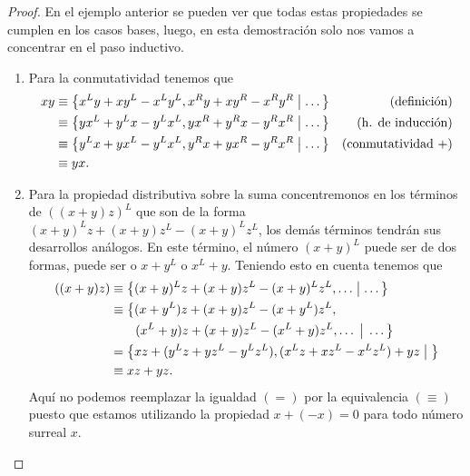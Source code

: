     \begin{proof}
        En el ejemplo anterior se pueden ver que todas estas propiedades se cumplen en los casos bases, luego, en esta demostraci\'on solo nos vamos a concentrar en el paso inductivo.

        \begin{enumerate}
            \item Para la conmutatividad tenemos que 
            \begin{align*}
                xy & \equiv \left\{x^Ly+xy^L-x^Ly^L, x^Ry+xy^R-x^Ry^R\;\middle|\; \dots\right\} &\text{(definici\'on)} \\
                & \equiv \left\{yx^L+y^Lx-y^Lx^L, yx^R+y^Rx-y^Rx^R\;\middle|\; \dots\right\} &\text{(h. de inducci\'on)} \\
                & \equiv \left\{y^Lx+yx^L-y^Lx^L, y^Rx+yx^R-y^Rx^R\;\middle|\; \dots\right\} &\text{(conmutatividad +)} \\
                & \equiv yx.
            \end{align*}
            \item Para la propiedad distributiva sobre la suma concentremonos en los t\'erminos de $((x+y)z)^L$ que son de la forma $(x+y)^Lz + (x+y)z^L - (x+y)^Lz^L$, los dem\'as t\'erminos tendr\'an sus desarrollos an\'alogos. En este t\'ermino, el n\'umero $(x+y)^L$ puede ser de dos formas, puede ser o $x+y^L$ o $x^L+y$. Teniendo esto en cuenta tenemos que 
            \begin{align*}
                ((x+y)z) & \equiv \left\{(x+y)^Lz + (x+y)z^L - (x+y)^Lz^L, \dots\;\middle|\; \dots\right\}\\
                & \equiv \big\{(x+y^L)z + (x+y)z^L - (x+y^L)z^L, \\
                & \quad\quad (x^L+y)z + (x+y)z^L - (x^L+y)z^L, \dots\;\big|\;\dots\big\} \\
                & = \left\{xz+(y^Lz + yz^L - y^Lz^L), (x^Lz + xz^L - x^Lz^L) + yz\;\middle|\; \right\}\\
                & \equiv xz + yz.
            \end{align*}
            Aqu\'i no podemos reemplazar la igualdad $(=)$ por la equivalencia $(\equiv)$ puesto que estamos utilizando la propiedad $x + (-x) = 0$ para todo n\'umero surreal $x$. 
            

\end{enumerate}
\end{proof}
